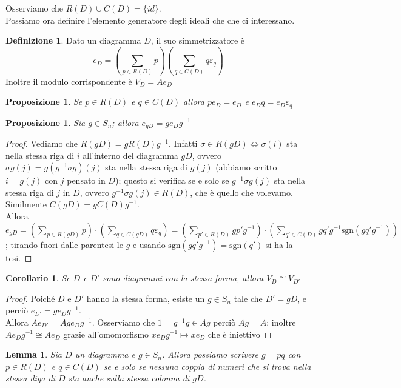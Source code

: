 \documentclass[11pt]{article}
\theoremstyle{plain}
\newtheorem{lemma}[thm]{Lemma}
\newtheorem{prop}[thm]{Proposizione}
\newtheorem*{cor}{Corollario}
\theoremstyle{definition}
\newtheorem{defn}{Definizione}[section]
\theoremstyle{remark}
\begin{document}
Osserviamo che $R(D)\cup C(D)=\{id\}$.\\
Possiamo ora definire l'elemento generatore degli ideali che che ci interessano.
\begin{defn}
	Dato un diagramma $D$, il suo simmetrizzatore è $$e_D=\left(\sum_{p\in R(D)}p \right)\left(\sum_{q\in C(D)}q\varepsilon_q\right)$$
	Inoltre il modulo corrispondente è $V_D=Ae_D$
\end{defn}
\begin{prop}\label{prop:assorbimento eD}
	Se $p\in R(D)$ e $q\in C(D)$ allora $pe_D=e_D$ e $e_Dq=e_D\varepsilon_q$
\end{prop}
\begin{prop}
	Sia $g\in S_n$; allora $e_{gD}=ge_Dg^{-1}$
\end{prop}
\begin{proof}
	Vediamo che $R(gD)=gR(D)g^{-1}$. Infatti $\sigma\in R(gD)\iff\sigma(i)$ sta nella stessa riga di $i$ all'interno del diagramma $gD$, ovvero $\sigma g (j)=g(g^{-1}\sigma g)(j)$ sta nella stessa riga di $g(j)$ (abbiamo scritto $i=g(j)$ con $j$ pensato in $D$); questo si verifica se e solo se $g^{-1}\sigma g(j)$ sta nella stessa riga di $j$ in $D$, ovvero $g^{-1}\sigma g(j)\in R(D)$, che è quello che volevamo.\\
	Similmente $C(gD)=gC(D)g^{-1}$.\\
	Allora $\displaystyle e_{gD}=\left(\sum_{p\in R(gD)}p \right)\cdot\left(\sum_{q\in C(gD)}q\varepsilon_q\right)=\left(\sum_{p'\in R(D)}gp'g^{-1} \right)\cdot\left(\sum_{q'\in C(D)}gq'g^{-1}\text{sgn}(gq'g^{-1})\right)$; tirando fuori dalle parentesi le $g$ e usando $\text{sgn}(gq'g^{-1})=\text{sgn}(q')$ si ha la tesi.
\end{proof}
\begin{cor}
	Se $D$ e $D'$ sono diagrammi con la stessa forma, allora $V_D\cong V_{D'}$
\end{cor}
\begin{proof}
	Poiché $D$ e $D'$ hanno la stessa forma, esiste un $g\in S_n$ tale che $D'=gD$, e perciò $e_{D'}=ge_Dg^{-1}$.\\
	Allora $Ae_{D'}=Age_Dg^{-1}$. Osserviamo che $1=g^{-1}g\in Ag$ perciò $Ag=A$; inoltre $Ae_Dg^{-1}\cong Ae_D$ grazie all'omomorfismo $xe_Dg^{-1}\mapsto xe_D$ che è iniettivo
\end{proof}
\begin{lemma}\label{Sn:g=pq}
	Sia $D$ un diagramma e $g\in S_n$. Allora possiamo scrivere $g=pq$ con $p\in R(D)$ e $q\in C(D)$ se e solo se nessuna coppia di numeri che si trova nella stessa diga di $D$ sta anche sulla stessa colonna di $gD$.
\end{lemma}
\end{document}
